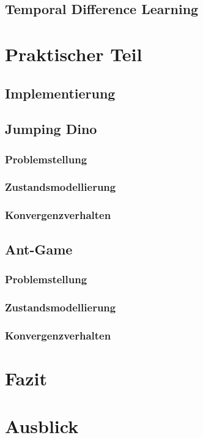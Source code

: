 \documentclass[12pt]{scrartcl}
\numberwithin{equation}{section}
\begin{document}
	\subsection{Temporal Difference Learning}\label{sec:TD}
	

\section{Praktischer Teil}
	\subsection{Implementierung}
	
	\subsection{Jumping Dino}
		\subsubsection{Problemstellung}
		\subsubsection{Zustandsmodellierung}
		\subsubsection{Konvergenzverhalten}
	\subsection{Ant-Game}
		\subsubsection{Problemstellung}
		\subsubsection{Zustandsmodellierung}
		\subsubsection{Konvergenzverhalten}

\section{Fazit}
\section{Ausblick}

\pagebreak

\pagebreak


\end{document}
